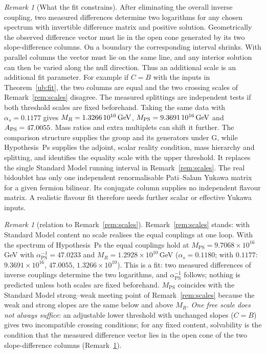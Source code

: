 \documentclass[aps,pra,onecolumn,superscriptaddress,nofootinbib,10pt]{revtex4-2}
\theoremstyle{definition}
\theoremstyle{remark}
\newtheorem{remark}[theorem]{Remark}
\begin{document}
\begin{remark}[What the fit constrains]\label{ub:fitcount}
After eliminating the overall inverse coupling, two measured differences
determine two logarithms for any chosen spectrum with invertible difference
matrix and positive solution. Geometrically the observed difference vector
must lie in the open cone generated by its two slope-difference columns.
On a boundary the corresponding interval shrinks. With parallel columns the
vector must lie on the same line, and any interior solution can then be
varied along the null direction. Thus an additional scale is an additional
fit parameter. For example if $C=B$ with the inputs in
Theorem~\ref{ub:fit}, the two columns are equal and the two crossing scales
of Remark~\ref{rem:scales} disagree. The measured splittings are independent
tests if both threshold scales are fixed beforehand. Taking the same data with
$\alpha_s=0.1177$ gives $M_R=1.3266\,10^{10}\,{\rm GeV}$, $M_{\rm PS}=9.3691\,10^{16}\,{\rm GeV}$
and $A_{\rm PS}=47.0055$. Mass ratios and
extra multiplets can shift it further. The comparison structure supplies the
group and its generators under G, while
Hypothesis~Ps supplies the adjoint, scalar reality condition,
mass hierarchy and splitting, and identifies the equality scale with the
upper threshold. It replaces the single Standard Model running interval in
Remark~\ref{rem:scales}. The real bidoublet has only one independent
renormalisable Pati--Salam Yukawa matrix for a given fermion bilinear.
Its conjugate column supplies no independent flavour matrix. A realistic
flavour fit therefore needs further scalar or effective Yukawa inputs.
\end{remark}

\begin{remark}[relation to Remark~\ref{rem:scales}]\label{rem:ubscales}
Remark~\ref{rem:scales} stands: with Standard Model content no scale realises the equal couplings at one
loop.  With the spectrum of Hypothesis~Ps the equal couplings hold at $M_{\mathrm{PS}}=9.7068\times10^{16}$\,GeV with $\alpha^{-1}_{\mathrm{PS}}=47.0233$ and
$M_R=1.2928\times10^{10}$\,GeV ($\alpha_s=0.1180$; with $0.1177$: $9.3691\times10^{16}$, $47.0055$, $1.3266\times10^{10}$).  This is a fit: two measured differences of inverse
couplings determine the two logarithms, and $\alpha^{-1}_{\mathrm{PS}}$ follows; nothing is predicted unless both scales are fixed
beforehand.  $M_{\mathrm{PS}}$ coincides with the Standard Model strong--weak meeting point of Remark~\ref{rem:scales}
because the weak and strong slopes are the same below and above $M_R$.  \emph{One free scale does not always
suffice}: an adjustable lower threshold with unchanged slopes ($C=B$) gives two incompatible crossing
conditions; for any fixed content, solvability is the condition that the measured difference vector lies in
the open cone of the two slope-difference columns (Remark~\ref{ub:fitcount}).
\end{remark}
\end{document}
